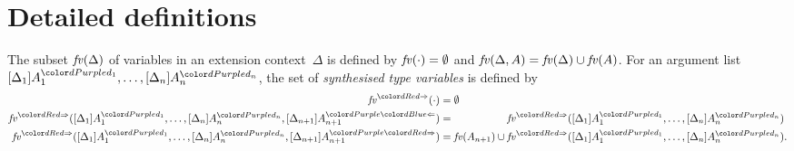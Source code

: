 
\section{Detailed definitions}\label{sec:defs-proofs}

\begin{definition}\label{def:syn-var}
  The subset $\mathit{fv}(\Delta)$ of variables in an extension context~$\Delta$ is defined by\/ $\mathit{fv}(\cdot) = \emptyset$ and\/ $\mathit{fv}(\Delta, A) = \mathit{fv}(\Delta) \cup \mathit{fv}(A)$.
  For an argument list $\biargs$, the set of \emph{synthesised type variables} is defined by 
  \begin{align*}
    \synvar(\cdot)                   & = \emptyset  \\
    \synvar(\biargs, \chkbiarg[n+1]) & = \phantom{\fv(A_{n+1}) \cup {}} \synvar(\biargs) \\
    \synvar(\biargs, \synbiarg[n+1]) & = \fv(A_{n+1}) \cup           \synvar(\biargs).
  \end{align*}
\end{definition}

